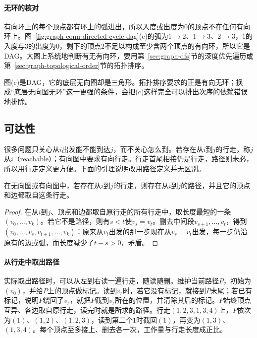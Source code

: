 \paragraph{无环的核对}
有向环上的每个顶点都有环上的弧进出，所以入度或出度为$0$的顶点不在任何有向环上。图~\ref{fig:graph-conn-directed-cycle-dag}(c)的弧为$1\to2$、$1\to3$、$2\to3$，$1$的入度与$3$的出度为$0$，剩下的顶点$2$不足以构成至少含两个顶点的有向环，所以它是DAG。大图上系统地判断有无有向环，要用第~\ref{sec:graph-dfs}节的深度优先遍历或第~\ref{sec:graph-topological-order}节的拓扑排序。

图(c)是DAG，它的底层无向图却是三角形。拓扑排序要求的正是有向无环；换成“底层无向图无环”这一更强的条件，会把(c)这样完全可以排出次序的依赖错误地排除。

\subsection{可达性}
\label{sec:graph-conn-reachability}

很多问题只关心从$i$出发能不能到达$j$，而不关心怎么到。若存在从$i$到$j$的行走，称$j$从$i$（reachable）；有向图中要求有向行走。行走首尾相接仍是行走，路径则未必，所以用行走定义更方便。下面的引理说明改用路径定义并无区别。

\begin{lemma}[行走中含有路径]
\label{lem:graph-conn-walk-contains-path}
在无向图或有向图中，若存在从$i$到$j$的行走，则存在从$i$到$j$的路径，并且它的顶点和边都取自这条行走。
\end{lemma}

\begin{proof}
在从$i$到$j$、顶点和边都取自原行走的所有行走中，取长度最短的一条$(v_0,\ldots,v_k)$。若它不是路径，则有$s<t$使$v_s=v_t$。删去中间段$v_{s+1},\ldots,v_t$，得到$(v_0,\ldots,v_s,v_{t+1},\ldots,v_k)$：原来从$v_t$出发的那一步现在从$v_s=v_t$出发，每一步仍沿原有的边或弧，而长度减少了$t-s>0$，矛盾。
\end{proof}

\paragraph{从行走中取出路径}
实际取出路径时，可以从左到右读一遍行走，随读随删。维护当前路径$P$，初始为$(v_0)$，并给$P$上的顶点做标记。读到$v_r$时，若它没有标记，就接到$P$末尾；若已有标记，说明$P$绕回了$v_r$，就把$P$截到$v_r$所在的位置，并清除其后的标记。$P$始终顶点互异、各边取自原行走，读完时就是所求的路径。行走$(1,2,3,1,3,4)$上，$P$依次为$(1)$、$(1,2)$、$(1,2,3)$，读到第二个$1$时截回$(1)$，再变为$(1,3)$、$(1,3,4)$。每个顶点至多接上、删去各一次，工作量与行走长度成正比。

